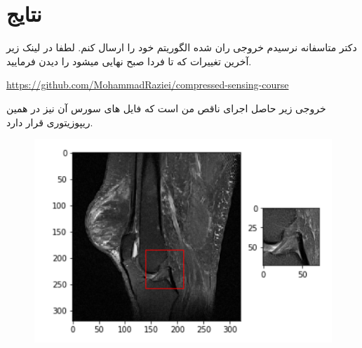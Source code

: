 \chapter{نتایج}

دکتر متاسفانه نرسیدم خروجی ران شده الگوریتم خود را ارسال کنم. لطفا در لینک زیر
آخرین تغییرات که تا فردا صبح نهایی میشود را دیدن فرمایید. 

\url{https://github.com/MohammadRaziei/compressed-sensing-course}

خروجی زیر حاصل اجرای ناقص من است که فایل های سورس آن نیز در همین ریپوزیتوری قرار دارد.
\begin{figure}[b!]
	\centering
	\includegraphics[width=0.7\linewidth]{figs/results}
	\caption{}
	\label{fig:results}
\end{figure}
